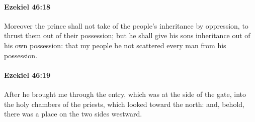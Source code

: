 		\paragraph{Ezekiel 46:18} %
			\label{EZEKIEL-46-18}

			Moreover the prince shall not take of the people’s inheritance by oppression, to thrust them out of their possession; but he shall give his sons inheritance out of his own possession: that my people be not scattered every man from his possession.


		\paragraph{Ezekiel 46:19} %
			\label{EZEKIEL-46-19}

			After he brought me through the entry, which was at the side of the gate, into the holy chambers of the priests, which looked toward the north: and, behold, there was a place on the two sides westward.

